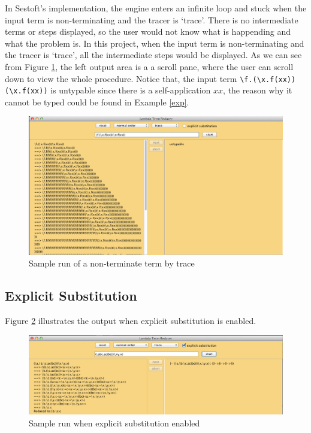 In Sestoft's implementation, the engine enters an infinite loop and stuck when the input term is non-terminating and the tracer is `trace'. There is no intermediate terms or steps displayed, so the user would not know what is happending and what the problem is. In this project, when the input term is non-terminating and the tracer is `trace', all the intermediate steps would be displayed. As we can see from Figure \ref{fig:nt}, the left output area is a a scroll pane, where the user can scroll down to view the whole procedure. Notice that, the input term \verb|\f.(\x.f(xx))(\x.f(xx))| is untypable since there is a self-application $xx$, the reason why it cannot be typed could be found in Example \ref{exp}.   

\begin{figure}[ht]
\centering
\includegraphics[width=\textwidth]{pics/nonterminate}
\caption{Sample run of a non-terminate term by trace}
\label{fig:nt}
\end{figure}

\subsection{Explicit Substitution}

Figure \ref{fig:explicit} illustrates the output when explicit substitution is enabled. 

\begin{figure}[ht]
\centering
\includegraphics[width=\textwidth]{pics/explicit}
\caption{Sample run when explicit substitution enabled}
\label{fig:explicit}
\end{figure}

